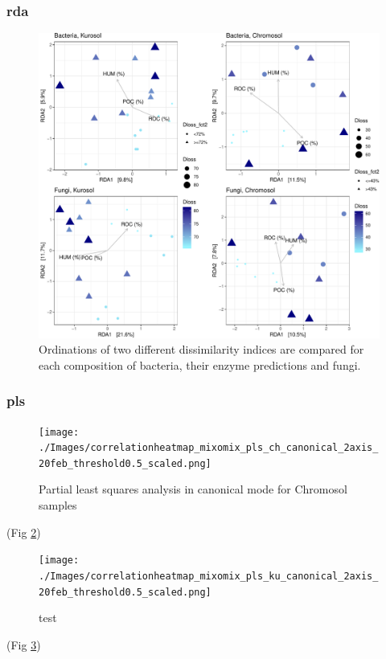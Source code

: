 \documentclass[
]{article}
\begin{document}
\hypertarget{rda}{%
\subsubsection{rda}\label{rda}}

\begin{figure}
\centering
\includegraphics{M2_Results_files/figure-latex/rda-1.pdf}
\caption{\label{fig:rda}Ordinations of two different dissimilarity indices are compared for each composition of bacteria, their enzyme predictions and fungi.}
\end{figure}

\hypertarget{pls}{%
\subsubsection{pls}\label{pls}}

\begin{figure}
\centering
\texttt{[image: ./Images/correlationheatmap\_mixomix\_pls\_ch\_canonical\_2axis\_20feb\_threshold0.5\_scaled.png]}
\caption{\label{fig:plsheatmapsch}Partial least squares analysis in canonical mode for Chromosol samples}
\end{figure}

(Fig \ref{fig:plsheatmapsch})

\begin{figure}
\centering
\texttt{[image: ./Images/correlationheatmap\_mixomix\_pls\_ku\_canonical\_2axis\_20feb\_threshold0.5\_scaled.png]}
\caption{\label{fig:plsheatmapsku}test}
\end{figure}

(Fig \ref{fig:plsheatmapsku})
\end{document}
